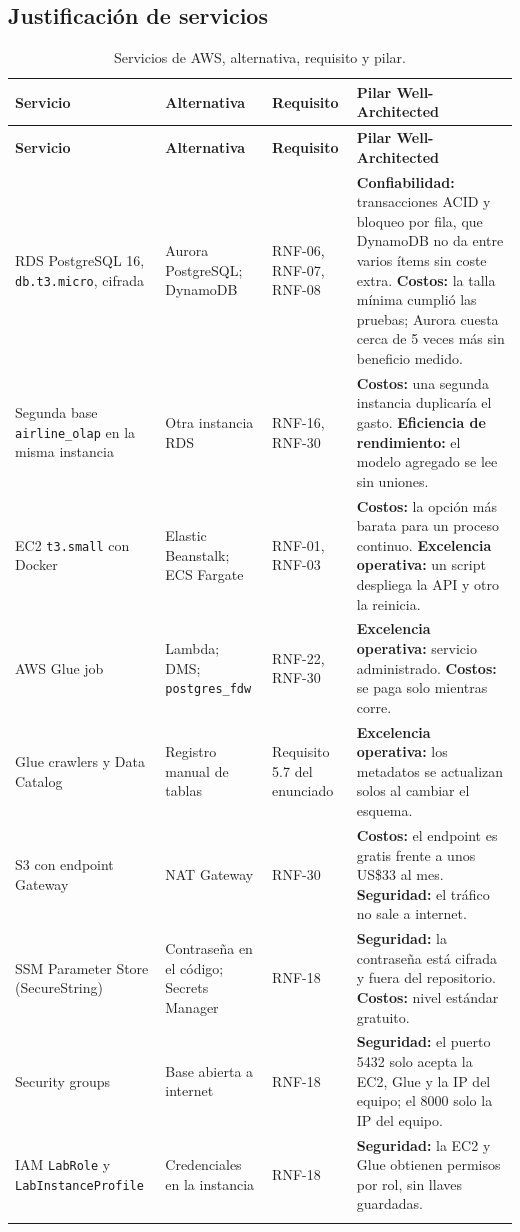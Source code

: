 \documentclass[10pt,letterpaper]{article}
\begin{document}
\subsection{Justificación de servicios}
\begin{longtable}{@{}L{3.0cm} L{2.6cm} L{2.6cm} L{7.4cm}@{}}
\toprule \textbf{Servicio} & \textbf{Alternativa} & \textbf{Requisito} & \textbf{Pilar Well-Architected} \\ \midrule \endfirsthead
\toprule \textbf{Servicio} & \textbf{Alternativa} & \textbf{Requisito} & \textbf{Pilar Well-Architected} \\ \midrule \endhead
RDS PostgreSQL 16, \texttt{db.t3.micro}, cifrada & Aurora PostgreSQL; DynamoDB & RNF-06, RNF-07, RNF-08 & \textbf{Confiabilidad:} transacciones ACID y bloqueo por fila, que DynamoDB no da entre varios ítems sin coste extra. \textbf{Costos:} la talla mínima cumplió las pruebas; Aurora cuesta cerca de 5 veces más sin beneficio medido. \\
Segunda base \texttt{airline\_olap} en la misma instancia & Otra instancia RDS & RNF-16, RNF-30 & \textbf{Costos:} una segunda instancia duplicaría el gasto. \textbf{Eficiencia de rendimiento:} el modelo agregado se lee sin uniones. \\
EC2 \texttt{t3.small} con Docker & Elastic Beanstalk; ECS Fargate & RNF-01, RNF-03 & \textbf{Costos:} la opción más barata para un proceso continuo. \textbf{Excelencia operativa:} un script despliega la API y otro la reinicia. \\
AWS Glue job & Lambda; DMS; \texttt{postgres\_fdw} & RNF-22, RNF-30 & \textbf{Excelencia operativa:} servicio administrado. \textbf{Costos:} se paga solo mientras corre. \\
Glue crawlers y Data Catalog & Registro manual de tablas & Requisito 5.7 del enunciado & \textbf{Excelencia operativa:} los metadatos se actualizan solos al cambiar el esquema. \\
S3 con endpoint Gateway & NAT Gateway & RNF-30 & \textbf{Costos:} el endpoint es gratis frente a unos US\$33 al mes. \textbf{Seguridad:} el tráfico no sale a internet. \\
SSM Parameter Store (SecureString) & Contraseña en el código; Secrets Manager & RNF-18 & \textbf{Seguridad:} la contraseña está cifrada y fuera del repositorio. \textbf{Costos:} nivel estándar gratuito. \\
Security groups & Base abierta a internet & RNF-18 & \textbf{Seguridad:} el puerto 5432 solo acepta la EC2, Glue y la IP del equipo; el 8000 solo la IP del equipo. \\
IAM \texttt{LabRole} y \texttt{LabInstanceProfile} & Credenciales en la instancia & RNF-18 & \textbf{Seguridad:} la EC2 y Glue obtienen permisos por rol, sin llaves guardadas. \\
\bottomrule
\caption{Servicios de AWS, alternativa, requisito y pilar.}
\end{longtable}
\end{document}
